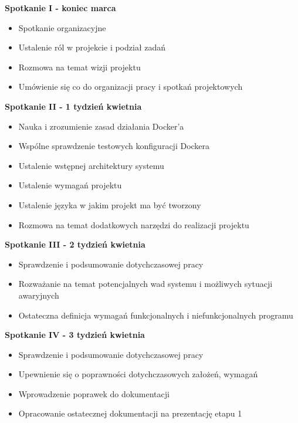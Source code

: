 \par{\textbf{Spotkanie I - koniec marca}}

\begin{itemize}
\item Spotkanie organizacyjne
\item Ustalenie ról w projekcie i podział zadań
\item Rozmowa na temat wizji projektu
\item Umówienie się co do organizacji pracy i spotkań projektowych
\end{itemize}

\par{\textbf{Spotkanie II - 1 tydzień kwietnia}}

\begin{itemize}
\item Nauka i zrozumienie zasad działania Docker'a
\item Wspólne sprawdzenie testowych konfiguracji Dockera
\item Ustalenie wstępnej architektury systemu
\item Ustalenie wymagań projektu
\item Ustalenie języka w jakim projekt ma być tworzony
\item Rozmowa na temat dodatkowych narzędzi do realizacji projektu
\end{itemize}


\par{\textbf{Spotkanie III - 2 tydzień kwietnia}}

\begin{itemize}
\item Sprawdzenie i podsumowanie dotychczasowej pracy
\item Rozważanie na temat potencjalnych wad systemu i możliwych sytuacji awaryjnych
\item Ostateczna definicja wymagań funkcjonalnych i niefunkcjonalnych programu
\end{itemize}


\par{\textbf{Spotkanie IV - 3 tydzień kwietnia}}

\begin{itemize}
\item Sprawdzenie i podsumowanie dotychczasowej pracy
\item Upewnienie się o poprawności dotychczasowych założeń, wymagań
\item Wprowadzenie poprawek do dokumentacji
\item Opracowanie ostatecznej dokumentacji na prezentację etapu 1
\end{itemize}

